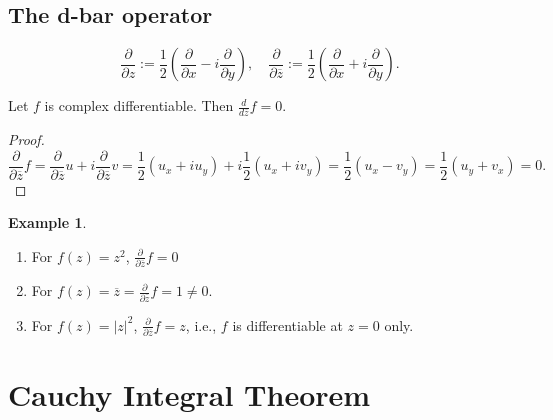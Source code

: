 \documentclass[12pt,openany]{book}
\theoremstyle{definition}
\newtheorem{example}{Example}[section]
\newcommand{\C}{\mathbb{C}}
\newcommand{\of}[1]{\left( #1 \right)}
\newcommand{\abs}[1]{\left\lvert #1 \right\rvert}
\newcommand{\conjugate}[1]{\overline{#1}}
\renewcommand{\Re}{\operatorname{Re}}
\renewcommand{\Im}{\operatorname{Im}}
\newcommand{\ie}{\textnormal{i.e.}}
\begin{document}
	\section{The d-bar operator}

	\[
	\boxed{\frac{\partial}{\partial z}:=\frac{1}{2}\of{\frac{\partial}{\partial x}-i\frac{\partial}{\partial y}}},\quad\boxed{\frac{\partial}{\partial\conjugate{z}}:=\frac{1}{2}\of{\frac{\partial}{\partial x}+i\frac{\partial}{\partial y}}}.
	\]
	\begin{tcolorbox}[colframe=thmcolor, title={\color{white}\bf }]
		Let $f$ is complex differentiable. Then $\frac{d}{d\conjugate{z}}f=0$.
	\end{tcolorbox}
	\begin{proof}
		\[
		\frac{\partial}{\partial\conjugate{z}}f=\frac{\partial}{\partial\conjugate{z}}u+i\frac{\partial}{\partial\conjugate{z}}v=\frac{1}{2}(u_x+iu_y)+i\frac{1}{2}(u_x+iv_y)=\frac{1}{2}(u_x-v_y)=\frac{1}{2}\of{u_y+v_x}=0.
		\]
	\end{proof}
	\vspace{8pt}
	\begin{example}
		\ \begin{enumerate}
			\item For $f(z)=z^2$, $\frac{\partial}{\partial\conjugate{z}}f=0$
			\item For $f(z)=\conjugate{z}=\frac{\partial}{\partial\conjugate{z}}f=1\neq 0$.
			\item For $f(z)=\abs{z}^2$, $\frac{\partial}{\partial\conjugate{z}}f=z$, \ie, $f$ is differentiable at $z=0$ only. 
		\end{enumerate}
	\end{example}
	
	\newpage
	\chapter{Cauchy Integral Theorem}
	
\end{document}
